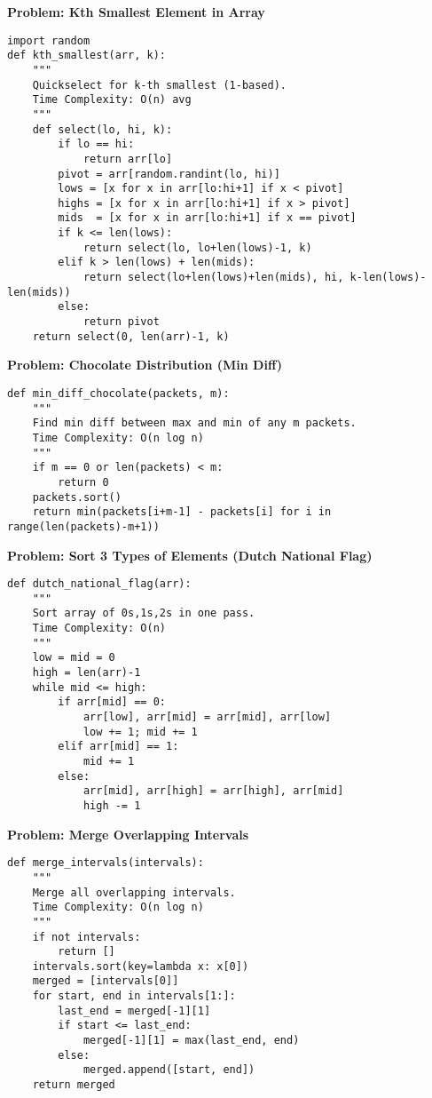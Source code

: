 \noindent\textbf{Problem: Kth Smallest Element in Array}
\begin{verbatim}
import random
def kth_smallest(arr, k):
    """
    Quickselect for k-th smallest (1-based).
    Time Complexity: O(n) avg
    """
    def select(lo, hi, k):
        if lo == hi:
            return arr[lo]
        pivot = arr[random.randint(lo, hi)]
        lows = [x for x in arr[lo:hi+1] if x < pivot]
        highs = [x for x in arr[lo:hi+1] if x > pivot]
        mids  = [x for x in arr[lo:hi+1] if x == pivot]
        if k <= len(lows):
            return select(lo, lo+len(lows)-1, k)
        elif k > len(lows) + len(mids):
            return select(lo+len(lows)+len(mids), hi, k-len(lows)-len(mids))
        else:
            return pivot
    return select(0, len(arr)-1, k)
\end{verbatim}

\noindent\textbf{Problem: Chocolate Distribution (Min Diff)}
\begin{verbatim}
def min_diff_chocolate(packets, m):
    """
    Find min diff between max and min of any m packets.
    Time Complexity: O(n log n)
    """
    if m == 0 or len(packets) < m:
        return 0
    packets.sort()
    return min(packets[i+m-1] - packets[i] for i in range(len(packets)-m+1))
\end{verbatim}

\noindent\textbf{Problem: Sort 3 Types of Elements (Dutch National Flag)}
\begin{verbatim}
def dutch_national_flag(arr):
    """
    Sort array of 0s,1s,2s in one pass.
    Time Complexity: O(n)
    """
    low = mid = 0
    high = len(arr)-1
    while mid <= high:
        if arr[mid] == 0:
            arr[low], arr[mid] = arr[mid], arr[low]
            low += 1; mid += 1
        elif arr[mid] == 1:
            mid += 1
        else:
            arr[mid], arr[high] = arr[high], arr[mid]
            high -= 1
\end{verbatim}

\noindent\textbf{Problem: Merge Overlapping Intervals}
\begin{verbatim}
def merge_intervals(intervals):
    """
    Merge all overlapping intervals.
    Time Complexity: O(n log n)
    """
    if not intervals:
        return []
    intervals.sort(key=lambda x: x[0])
    merged = [intervals[0]]
    for start, end in intervals[1:]:
        last_end = merged[-1][1]
        if start <= last_end:
            merged[-1][1] = max(last_end, end)
        else:
            merged.append([start, end])
    return merged
\end{verbatim}

